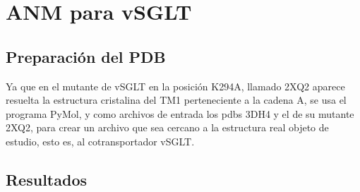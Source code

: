 \section{ANM para vSGLT}
\subsection{Preparaci\'{o}n del PDB}
Ya que en el mutante de vSGLT en la posici\'{o}n K294A, llamado 2XQ2 aparece resuelta la estructura cristalina del TM1 perteneciente a la cadena A, se usa el programa PyMol, y como archivos de entrada los pdbs 3DH4 y el de su mutante 2XQ2, para crear un archivo que sea cercano a la estructura real objeto de estudio, esto es, al cotransportador vSGLT. 
\subsection{Resultados}

